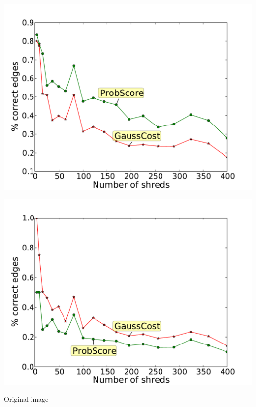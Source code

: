 \documentclass[portrait,final,a0paper,fontscale=0.277]{baposter}
\begin{document}
\begin{poster}
{    \begin{minipage}[t]{0.98\linewidth}
        \centering
        \begin{minipage}[t]{0.48\linewidth}
                \centering
                \includegraphics[width=\textwidth]{origComp}
        \end{minipage}
        \begin{minipage}[t]{0.48\linewidth}
                \centering
                \includegraphics[width=\textwidth]{noise}
        \end{minipage}
        \begin{minipage}[t]{0.48\linewidth}
                \centering
                \smaller Original image
        \end{minipage}

\end{minipage}}
\end{poster}
\end{document}
